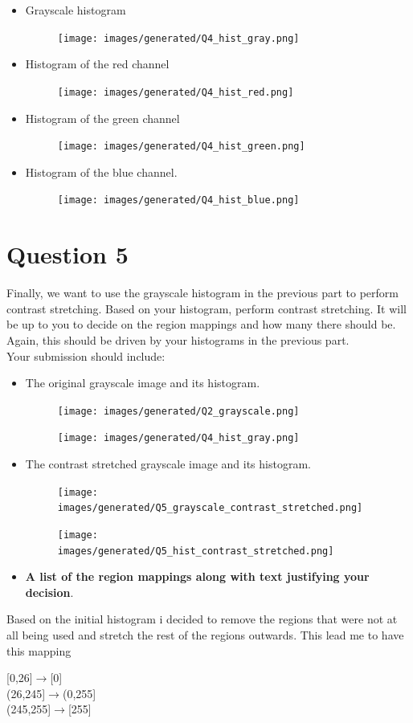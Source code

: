 \documentclass{article}
\begin{document}
\begin{itemize}
\item Grayscale histogram
\begin{figure}
    \texttt{[image: images/generated/Q4\_hist\_gray.png]}
\end{figure}
\item Histogram of the red channel
\begin{figure}
    \texttt{[image: images/generated/Q4\_hist\_red.png]}
\end{figure}
\item Histogram of the green channel
\begin{figure}
    \texttt{[image: images/generated/Q4\_hist\_green.png]}
\end{figure}
\item Histogram of the blue channel.
\begin{figure}
    \texttt{[image: images/generated/Q4\_hist\_blue.png]}
\end{figure}
\end{itemize}


\section*{Question 5}
Finally, we want to use the grayscale histogram in the previous part to perform contrast stretching.   Based on your histogram, perform contrast stretching.  It will be up to you to decide on the region mappings and how many there should be.  Again, this should be driven by your histograms in the previous part.\\

\noindent
Your submission should include:
\begin{itemize}
\item The original grayscale image and its histogram.
\begin{figure}
    \texttt{[image: images/generated/Q2\_grayscale.png]}
\end{figure}
\begin{figure}
    \texttt{[image: images/generated/Q4\_hist\_gray.png]}
\end{figure}
\item The contrast stretched grayscale image and its histogram.
\begin{figure}
    \texttt{[image: images/generated/Q5\_grayscale\_contrast\_stretched.png]}
\end{figure}
\begin{figure}
    \texttt{[image: images/generated/Q5\_hist\_contrast\_stretched.png]}
\end{figure}
\item \textbf{A list of the region mappings along with text justifying your decision}.
\end{itemize}
Based on the initial histogram i decided to remove the regions that were not at all being used and stretch the rest of the regions outwards.
This lead me to have this mapping
\begin{center}
[0,26]$\rightarrow$[0]\\
(26,245]$\rightarrow$(0,255]\\
(245,255]$\rightarrow$[255]
\end{center}
\end{document}
